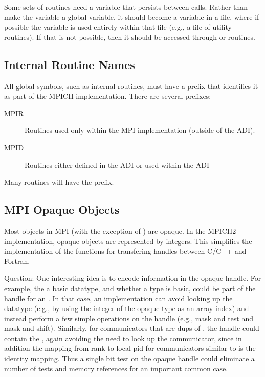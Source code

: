 \documentclass{article}
\begin{document}
Some sets of routines need a variable that persists between calls.
Rather than make the variable a global variable, it should become a
 variable in a file, where if possible the variable is used
entirely within that file (e.g., a file of utility routines).  If that is not
possible, then it should be accessed through  or 
routines.  


\subsection{Internal Routine Names}
\label{sec:routine-names}
All global symbols, such as internal routines, must have a prefix that
identifies it as part of the MPICH implementation.  There are several
prefixes:
\begin{description}
\item[MPIR]Routines used only within the MPI implementation (outside of the
  ADI).
\item[MPID]Routines either defined in the ADI or used within the ADI
\end{description}
Many routines will have the  prefix.

\subsection{MPI Opaque Objects}
\label{sec:mpi-opaque}
Most objects in MPI (with the exception of ) are
opaque.  In the MPICH2 implementation, opaque objects are represented
by integers.  This simplifies the implementation of the functions for
transfering handles between C/C++ and Fortran.  

Question:  One interesting idea is to encode information in the opaque
handle.  For example, the  a basic datatype, and whether
a type is basic, could be part of the handle for an
. In that case, an implementation can avoid looking
up the datatype (e.g., by using the integer of the opaque type as an
array index) and instead perform a few simple operations on the handle
(e.g., mask and test and mask and shift).  Similarly, for
communicators that are dups of , the handle could
contain the , again avoiding the need to look up the
communicator, since in addition the mapping from rank to local pid for 
communicators similar to  is the identity
mapping.  Thus a single bit test on the opaque handle could eliminate
a number of tests and memory references for an important common case.
\end{document}
